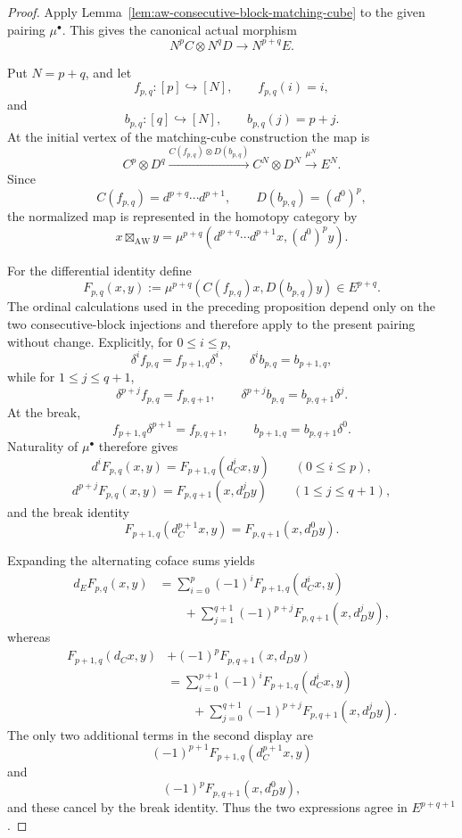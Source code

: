 \begin{proof}
Apply Lemma~\ref{lem:aw-consecutive-block-matching-cube} to the given pairing
\(\mu^\bullet\).  This gives the canonical actual morphism
\[
    N^pC\otimes N^qD
    \longrightarrow
    N^{p+q}E.
\]

Put \(N=p+q\), and let
\[
    f_{p,q}:[p]\hookrightarrow[N],
    \qquad
    f_{p,q}(i)=i,
\]
and
\[
    b_{p,q}:[q]\hookrightarrow[N],
    \qquad
    b_{p,q}(j)=p+j.
\]
At the initial vertex of the matching-cube construction the map is
\[
    C^p\otimes D^q
    \xrightarrow{
        C(f_{p,q})\otimes D(b_{p,q})
    }
    C^N\otimes D^N
    \xrightarrow{\mu^N}
    E^N.
\]
Since
\[
    C(f_{p,q})
    =
    d^{p+q}\cdots d^{p+1},
    \qquad
    D(b_{p,q})
    =
    (d^0)^p,
\]
the normalized map is represented in the homotopy category by
\[
    x\boxtimes_{\mathrm{AW}}y
    =
    \mu^{p+q}
    \left(
        d^{p+q}\cdots d^{p+1}x,
        (d^0)^py
    \right).
\]

For the differential identity define
\[
    F_{p,q}(x,y)
    :=
    \mu^{p+q}
    \left(
        C(f_{p,q})x,
        D(b_{p,q})y
    \right)
    \in E^{p+q}.
\]
The ordinal calculations used in the preceding proposition depend only on
the two consecutive-block injections and therefore apply to the present
pairing without change.  Explicitly, for \(0\leq i\leq p\),
\[
    \delta^if_{p,q}
    =
    f_{p+1,q}\delta^i,
    \qquad
    \delta^ib_{p,q}
    =
    b_{p+1,q},
\]
while for \(1\leq j\leq q+1\),
\[
    \delta^{p+j}f_{p,q}
    =
    f_{p,q+1},
    \qquad
    \delta^{p+j}b_{p,q}
    =
    b_{p,q+1}\delta^j.
\]
At the break,
\[
    f_{p+1,q}\delta^{p+1}
    =
    f_{p,q+1},
    \qquad
    b_{p+1,q}
    =
    b_{p,q+1}\delta^0.
\]
Naturality of \(\mu^\bullet\) therefore gives
\[
    d^iF_{p,q}(x,y)
    =
    F_{p+1,q}(d_C^ix,y)
    \qquad(0\leq i\leq p),
\]
\[
    d^{p+j}F_{p,q}(x,y)
    =
    F_{p,q+1}(x,d_D^jy)
    \qquad(1\leq j\leq q+1),
\]
and the break identity
\[
    F_{p+1,q}(d_C^{p+1}x,y)
    =
    F_{p,q+1}(x,d_D^0y).
\]

Expanding the alternating coface sums yields
\[
\begin{aligned}
    d_EF_{p,q}(x,y)
    &=
    \sum_{i=0}^{p}
    (-1)^i
    F_{p+1,q}(d_C^ix,y)
    \\
    &\qquad+
    \sum_{j=1}^{q+1}
    (-1)^{p+j}
    F_{p,q+1}(x,d_D^jy),
\end{aligned}
\]
whereas
\[
\begin{aligned}
    F_{p+1,q}(d_Cx,y)
    &+
    (-1)^pF_{p,q+1}(x,d_Dy)
    \\
    &=
    \sum_{i=0}^{p+1}
    (-1)^i
    F_{p+1,q}(d_C^ix,y)
    \\
    &\qquad+
    \sum_{j=0}^{q+1}
    (-1)^{p+j}
    F_{p,q+1}(x,d_D^jy).
\end{aligned}
\]
The only two additional terms in the second display are
\[
    (-1)^{p+1}
    F_{p+1,q}(d_C^{p+1}x,y)
\]
and
\[
    (-1)^p
    F_{p,q+1}(x,d_D^0y),
\]
and these cancel by the break identity.  Thus the two expressions agree in
\(E^{p+q+1}\).


\end{proof}
